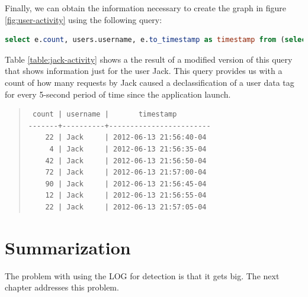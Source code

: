 Finally, we can obtain the information necessary to create the graph in figure \ref{fig:user-activity} using the following query:

\begin{lstlisting}[language=SQL, deletendkeywords={TIMESTAMP}, label=code:query-accesses]
select e.count, users.username, e.to_timestamp as timestamp from (select count(*), tags_modified, (to_timestamp(((extract (epoch from events.timestamp)/5)::int)*5)) from events tags_modified in (select tag from users) group by (to_timestamp(((extract (epoch from events.timestamp)/5)::int)*5)), tags_modified) as e inner join users on e.tags_modified=users.tag
\end{lstlisting}

Table \ref{table:jack-activity} shows a the result of a modified version of this query that shows information just for the user Jack. This query provides us with a count of how many requests by Jack caused a declassification of a user data tag for every 5-second period of time since the application launch.

\begin{table}
\begin{quote}
\begin{verbatim}
 count | username |       timestamp        
-------+----------+------------------------
    22 | Jack     | 2012-06-13 21:56:40-04
     4 | Jack     | 2012-06-13 21:56:35-04
    42 | Jack     | 2012-06-13 21:56:50-04
    72 | Jack     | 2012-06-13 21:57:00-04
    90 | Jack     | 2012-06-13 21:56:45-04
    12 | Jack     | 2012-06-13 21:56:55-04
    22 | Jack     | 2012-06-13 21:57:05-04
\end{verbatim}
\end{quote}
\caption*{Account activity for user \emph{Jack}}
\caption{This table shows the number of declassifies done by Jack's principal in each five-second period since the application launched. The \emph{count} denotes such number. The \emph{username} column denotes the user who's data tag is in question. The \emph{timestamp} column denotes the start of the 5-second period. A table containing similar information for all users would be a precursor to producing the graph in figure \ref{fig:user-activity}, here we only show this data for user Jack for simplicity.}
\label{table:jack-activity}
\end{table}

\section{Summarization}

The problem with using the LOG for detection is that it gets big. The next chapter addresses this problem.
